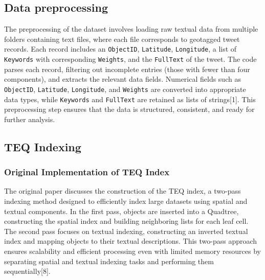 \documentclass[conference]{IEEEtran}
\begin{document}
\subsection{\textbf{Data preprocessing}}
The preprocessing of the dataset involves loading raw textual data from multiple folders containing text files, where each file corresponds to geotagged tweet records. Each record includes an \texttt{ObjectID}, \texttt{Latitude}, \texttt{Longitude}, a list of \texttt{Keywords} with corresponding \texttt{Weights}, and the \texttt{FullText} of the tweet. The code parses each record, filtering out incomplete entries (those with fewer than four components), and extracts the relevant data fields. Numerical fields such as \texttt{ObjectID}, \texttt{Latitude}, \texttt{Longitude}, and \texttt{Weights} are converted into appropriate data types, while \texttt{Keywords} and \texttt{FullText} are retained as lists of strings[1]. This preprocessing step ensures that the data is structured, consistent, and ready for further analysis.

\subsection{\textbf{TEQ Indexing}}

\subsubsection{\textbf{Original Implementation of TEQ Index}}
The original paper discusses the construction of the TEQ index, a two-pass indexing method designed to efficiently index large datasets using spatial and textual components. In the first pass, objects are inserted into a Quadtree, constructing the spatial index and building neighboring lists for each leaf cell. The second pass focuses on textual indexing, constructing an inverted textual index and mapping objects to their textual descriptions. This two-pass approach ensures scalability and efficient processing even with limited memory resources by separating spatial and textual indexing tasks and performing them sequentially[8].
\end{document}
